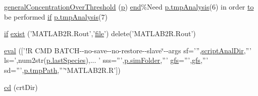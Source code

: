\begin{DoxyCompactItemize}
\hyperlink{a00026_a56bd5c817530f9b305b5375d6509978a}{general\-Concentration\-Over\-Threshold} (\hyperlink{a00022_aa2b4c35904308d35fc5d606a429e608d}{p}) \hyperlink{a00019_afb358f48b1646c750fb9da6c6585be2b}{end}\%Need \hyperlink{a00026_a98ae4bf3f5f573af6ea4fc18d2a1125e}{p.\-tmp\-Analysis}(6) in order \hyperlink{a00022_af71dbe52628a3f83a77ab494817525c6}{to} be performed \hyperlink{a00024_a01d55766b8058903dd360b4bda71f9f5}{if} \hyperlink{a00026_a98ae4bf3f5f573af6ea4fc18d2a1125e}{p.\-tmp\-Analysis}(7)
\item 
\hyperlink{a00024_a01d55766b8058903dd360b4bda71f9f5}{if} \hyperlink{a00026_ab41b8dc78dee42a1a5e5a33d8bf6eeb3}{exist} ('M\-A\-T\-L\-A\-B2\-R.\-Rout','\hyperlink{a00062_a4e8353d6c62cf54bf4a1a8f63e56b8c3}{file}') delete('M\-A\-T\-L\-A\-B2\-R.\-Rout')
\item 
\hyperlink{a00026_ab4c95c2d6a84263412f5679a78b55e41}{eval} (\mbox{[}'!R C\-M\-D B\-A\-T\-C\-H-\/-\/no-\/save-\/-\/no-\/restore-\/-\/slave\char`\"{}-\/-\/args sf=''',\hyperlink{a00026_a2a07fff00b80967a40ae67d91fd31cb4}{script\-Anal\-Dir},''' ls=',num2str(\hyperlink{a00026_aad7be196243f3c9ca83dfee7c9111014}{p.\-last\-Species}),...
        ' sss=''',\hyperlink{a00026_aa671e3345005bd599e662bcaa115b18a}{p.\-sim\-Folder},''' \hyperlink{a00026_a5714ee99d309183e59b051e92e5a44d1}{gfs}=''',\hyperlink{a00026_a5714ee99d309183e59b051e92e5a44d1}{gfs},''' sd=''',\hyperlink{a00026_a1e5a4863ab2b87f923e1d19e2da1f5ac}{p.\-tmp\-Path},'''\char`\"{}M\-A\-T\-L\-A\-B2\-R.\-R'\mbox{]})
\item 
\hyperlink{a00026_a2160a514930abbfa9436b787b4cfc8ab}{cd} (crt\-Dir)
\end{DoxyCompactItemize}
